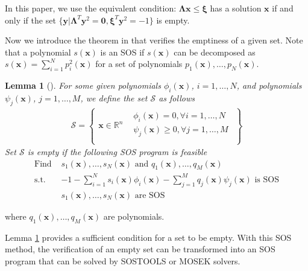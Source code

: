 \documentclass[letterpaper, 10 pt, conference]{ieeeconf}  %
\newtheorem{lemma}{Lemma}
\begin{document}
In this paper, we use the equivalent condition:  $\boldsymbol{\Lambda} \mathbf{x}\leq\boldsymbol{\xi}$ has a solution $\mathbf{x}$ if and only if the set $\{\mathbf{y}|\boldsymbol{\Lambda}^T\mathbf{y}^2 = \mathbf{0}, \boldsymbol{\xi}^T\mathbf{y}^2=-1\}$ is empty.

Now we introduce the theorem in \cite{dai2024verification} that verifies the emptiness of a given set. Note that a polynomial $s(\mathbf{x})$ is an SOS if $s(\mathbf{x})$ can be decomposed as $s(\mathbf{x}) = \sum_{i=1}^{N}p^2_i(\mathbf{x})$ for a set of polynomials $p_1(\mathbf{x}),\dots,p_N(\mathbf{x})$. 
\begin{lemma}[\cite{dai2024verification}]
\label{lemma:empty_verif}
    For some given polynomials $\phi_{i}(\mathbf{x})$, $i=1,\dots,N$, and polynomials $\psi_{j}(\mathbf{x})$, $j=1,\dots,M$, we define the set $\mathcal{S}$ as follows
    \begin{align*}
        \mathcal{S} = \left\{
        \begin{array}{l|ll}
        \mathbf{x} \in \mathbb{R}^{n} &
        \begin{array}{ll}
        \phi_{i}(\mathbf{x})=0,\forall i=1,\ldots,N\\
        \psi_{j}(\mathbf{x}) \geq 0,\forall j=1,\ldots,M\\
        \end{array}
        \end{array}
        \right\}
    \end{align*}
    Set $\mathcal{S}$ is empty if the following SOS program is feasible
    \begin{align*}
        \text{Find }& s_1(\mathbf{x}),\dots,s_N(\mathbf{x}) \text{ and }q_1(\mathbf{x}),\dots,q_M(\mathbf{x})\\
        \text{s.t. }&
        -1-\sum_{i=1}^{N}s_i(\mathbf{x})\phi_i(\mathbf{x}) - \sum_{j=1}^{M}q_j(\mathbf{x})\psi_j(\mathbf{x}) \text{ is SOS}\\
        & s_1(\mathbf{x}),\dots,s_N(\mathbf{x}) \text{ are SOS}
    \end{align*}
\end{lemma}
where $q_1(\mathbf{x}),\dots,q_M(\mathbf{x})$ are polynomials.

Lemma \ref{lemma:empty_verif} provides a sufficient condition for a set to be empty. With this SOS method, the verification of an empty set can be transformed into an SOS program that can be solved by SOSTOOLS\cite{prajna2002introducing} or MOSEK\cite{aps2022mosek} solvers. 
\end{document}
